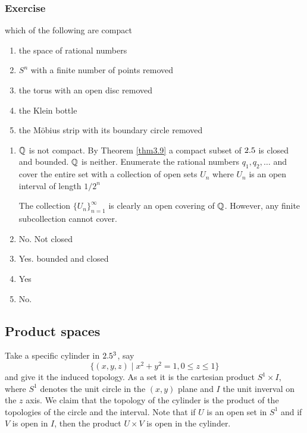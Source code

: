\documentclass[11pt]{article}
\begin{document}
\subsubsection{Exercise}
\label{sec:org4390bc3}
\begin{exercise}
which of the following are compact
\begin{enumerate}
\item the space of rational numbers
\item \(S^n\) with a finite number of points removed
\item the torus with an open disc removed
\item the Klein bottle
\item the Möbius strip with its boundary circle removed
\end{enumerate}


\begin{enumerate}
\item \(\mathbb{Q}\) is not compact. By Theorem \ref{thm3.9} a compact subset of \(2.5\)
is closed and bounded. \(\mathbb{Q}\) is neither. Enumerate the rational numbers
\(q_1,q_2,\dots\) and cover the entire set with a collection of open sets
\(U_n\) where \(U_n\) is an open interval of length \(1/2^n\)

The collection \(\{U_n\}_{n=1}^\infty\) is clearly an open covering of
\(\mathbb{Q}\). However, any finite subcollection cannot cover.

\item No. Not closed

\item Yes. bounded and closed

\item Yes

\item No.
\end{enumerate}
\end{exercise}

\subsection{Product spaces}
\label{sec:org372e106}
Take a specific cylinder in \(2.5^3\), say
\begin{equation*}
\{(x,y,z)\mid x^2+y^2=1,0\le z\le 1\}
\end{equation*}
and give it the induced topology. As a set it is the cartesian product
\(S^1\times I\), where \(S^1\) denotes the unit circle in the \((x,y)\) plane
and \(I\) the unit inverval on the \(z\) axis. We claim that the topology of
the cylinder is the product of the topologies of the circle and the interval.
Note that if \(U\) is an open set in \(S^1\) and if \(V\) is open in \(I\),
then the product \(U\times V\) is open in the cylinder.
\end{document}
